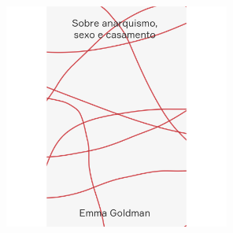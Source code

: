 


\begin{center}
\hspace*{-3.6cm}
\hspace*{3.1cm}\includegraphics[width=74mm]{./CAPAS/HEDRA_GOLDMAN.jpg}
\end{center}
\hspace*{-7cm}\hrulefill\hspace*{-7cm}
\medskip

